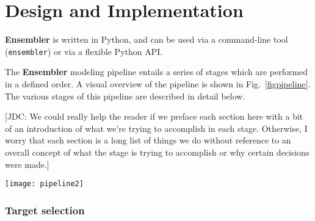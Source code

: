 \documentclass[aps,pre,twocolumn,nofootinbib,superscriptaddress,linenumbers]{revtex4-1}
\begin{document}
\section{Design and Implementation}


{\bf Ensembler} is written in Python, and can be used via a command-line tool ({\tt ensembler}) or via a flexible Python API.


The {\bf Ensembler} modeling pipeline entails a series of stages which are performed in a defined order. 
A visual overview of the pipeline is shown in Fig.~\ref{figpipeline}.
The various stages of this pipeline are described in detail below.

{\color{red}[JDC: We could really help the reader if we preface each section here with a bit of an introduction of what we're trying to accomplish in each stage.  Otherwise, I worry that each section is a long list of things we do without reference to an overall concept of what the stage is trying to accomplish or why certain decisions were made.]}

\begin{figure*}[tb]
  \centering
    \texttt{[image: pipeline2]}
  \caption{{\bf Diagrammatic representation of the various stages of the Ensembler pipeline.}
  The number of viable models surviving each stage of the pipeline for are shown, either for all tyrosine kinases (\emph{All TKs}) or representative individual kinases (\emph{SRC} and \emph{ABL}).
  In addition, the typical timing on a cluster (containing Intel Xeon E5-2665 2.4GHz hyperthreaded processors and NVIDIA GTX-680 or GTX-Titan GPUs) is reported to convey resources required per model and for modeling the entire set of tyrosine kinases.
  Note that \emph{CPU-h} denotes the number of hours consumed by the equivalent of a single hyperthread---parallel execution can reduce wall clock time nearly linearly.
  }
  \label{figpipeline}
\end{figure*}

\subsubsection{Target selection}
\end{document}
